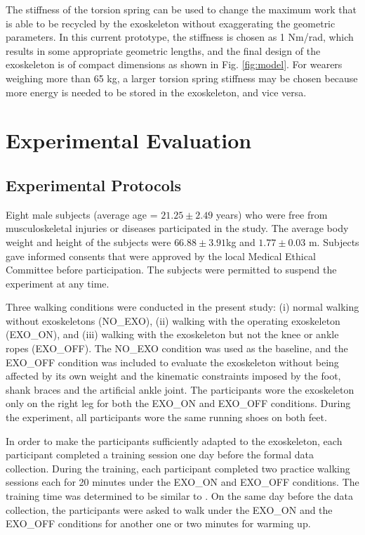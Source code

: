 \documentclass[twocolumn,cleanfoot,10pt]{asme2ej}
\begin{document}

The stiffness of the torsion spring can be used to change the maximum work that is able to be recycled by the exoskeleton without exaggerating the geometric parameters.
In this current prototype, the stiffness is chosen as 1 Nm/rad, which results in some appropriate geometric lengths, and the final design of the exoskeleton is of compact dimensions as shown in Fig. \ref{fig:model}.
For wearers weighing more than 65 kg, a larger torsion spring stiffness may be chosen because more energy is needed to be stored in the exoskeleton, and vice versa.

\section{Experimental Evaluation}
\label{sec:experiment}  

\subsection{Experimental Protocols}

Eight male subjects (average age = $21.25 \pm2.49$ years) who were free from musculoskeletal injuries or diseases participated in the study.
The average body weight and height of the subjects were $66.88\pm3.91$kg and $1.77\pm0.03$ m.
Subjects gave informed consents that were approved by the local Medical Ethical Committee before participation.
The subjects were permitted to suspend the experiment at any time. 

Three walking conditions were conducted in the present study: (i) normal walking without exoskeletons (NO\_EXO), (ii) walking with the operating exoskeleton (EXO\_ON), and (iii) walking with the exoskeleton but not the knee or ankle ropes (EXO\_OFF).
The NO\_EXO condition was used as the baseline, and the EXO\_OFF condition was included to evaluate the exoskeleton without being affected by its own weight and the kinematic constraints imposed by the foot, shank braces and the artificial ankle joint.
The participants wore the exoskeleton only on the right leg for both the EXO\_ON and EXO\_OFF conditions.
During the experiment, all participants wore the same running shoes on both feet. 

In order to make the participants sufficiently adapted to the exoskeleton, each participant completed a training session one day before the formal data collection.
During the training, each participant completed two practice walking sessions each for 20 minutes under the EXO\_ON and EXO\_OFF conditions.
The training time was determined to be similar to \cite{RN5}.
On the same day before the data collection, the participants were asked to walk under the EXO\_ON and the EXO\_OFF conditions for another one or two minutes for warming up.
\end{document}
